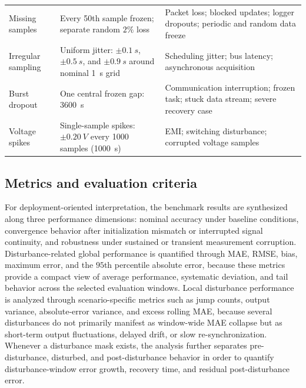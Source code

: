 \documentclass[review,nopreprintline]{elsarticle}
\begin{document}
\begin{longtable}{@{}p{1.55cm}p{3.65cm}p{5.75cm}@{}}
    \addlinespace[2pt]
    Missing samples & Every 50th sample frozen; separate random $2\%$ loss & Packet loss; blocked updates; logger dropouts; periodic and random data freeze \cite{naseriReliableWirelessBMS2025,liuAssessingImpactSampling2025} \\
    \addlinespace[2pt]
    Irregular sampling & Uniform jitter: $\pm\SI{0.1}{s}$, $\pm\SI{0.5}{s}$, and $\pm\SI{0.9}{s}$ around nominal \SI{1}{s} grid & Scheduling jitter; bus latency; asynchronous acquisition \cite{bergerBenchmarkingBatteryManagement2024,naseriReliableWirelessBMS2025,liuAssessingImpactSampling2025} \\
    \addlinespace[2pt]
    Burst dropout & One central frozen gap: \SI{3600}{s} & Communication interruption; frozen task; stuck data stream; severe recovery case \cite{bergerBenchmarkingBatteryManagement2024,naseriReliableWirelessBMS2025} \\
    \addlinespace[2pt]
    Voltage spikes & Single-sample spikes: $\pm\SI{0.20}{V}$ every 1000 samples (\SI{1000}{s}) & EMI; switching disturbance; corrupted voltage samples \cite{aielloElectromagneticSusceptibilityBattery2020} \\
\end{longtable}
\endgroup

\subsection{Metrics and evaluation criteria}
For deployment-oriented interpretation, the benchmark results are synthesized along three performance dimensions: nominal accuracy under baseline conditions, convergence behavior after initialization mismatch or interrupted signal continuity, and robustness under sustained or transient measurement corruption. Disturbance-related global performance is quantified through MAE, RMSE, bias, maximum error, and the $95$th percentile absolute error, because these metrics provide a compact view of average performance, systematic deviation, and tail behavior across the selected evaluation windows. Local disturbance performance is analyzed through scenario-specific metrics such as jump counts, output variance, absolute-error variance, and excess rolling MAE, because several disturbances do not primarily manifest as window-wide MAE collapse but as short-term output fluctuations, delayed drift, or slow re-synchronization. Whenever a disturbance mask exists, the analysis further separates pre-disturbance, disturbed, and post-disturbance behavior in order to quantify disturbance-window error growth, recovery time, and residual post-disturbance error.
\end{document}
